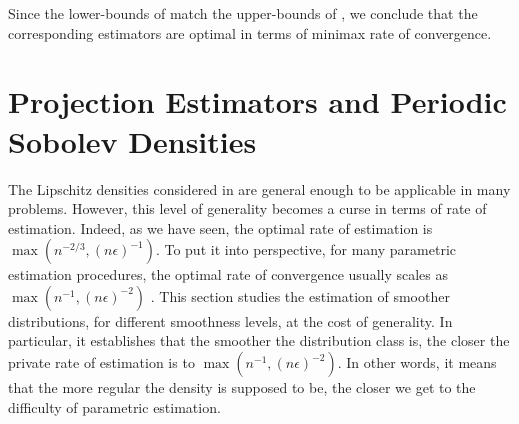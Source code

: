 \documentclass[10pt]{article} %
\newcommand\p[1]{\left( {#1}\right)}
\begin{document}
Since the lower-bounds of  match the upper-bounds of , we conclude that the corresponding estimators are optimal in terms of minimax rate of convergence.

\section{Projection Estimators and Periodic Sobolev Densities}
\label{sec:projection}

The Lipschitz densities considered in  are general enough to be applicable in many problems. However, this level of generality becomes a curse in terms of rate of estimation. Indeed, as we have seen, the optimal rate of estimation is $\max \p{n^{-2/3}, (n \epsilon)^{-1}}$. To put it into perspective, for many parametric estimation procedures, the optimal rate of convergence usually scales as $\max \p{n^{-1}, (n \epsilon)^{-2}}$ \citep{acharya2021differentially}. This section studies the estimation of smoother distributions, for different smoothness levels, at the cost of generality. In particular, it establishes that the smoother the distribution class is, the closer the private rate of estimation is to $\max \p{n^{-1}, (n \epsilon)^{-2}}$. In other words, it means that the more regular the density is supposed to be, the closer we get to the difficulty of parametric estimation.
\end{document}
